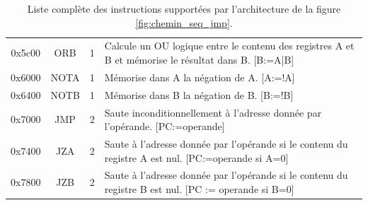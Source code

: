 \begin{table}[htbp]
\begin{tabular}{cccp{10cm}}
0x5c00&	ORB  &1 & Calcule un OU logique entre le contenu des registres A et B et mémorise le résultat dans B. [B:=A|B]\\
0x6000&	NOTA &1 & Mémorise dans A la négation de A. [A:=!A]\\
0x6400&	NOTB &1 &Mémorise dans B la négation de B. [B:=!B]\\
0x7000&	JMP  &2 &Saute inconditionnellement à l'adresse donnée par l'opérande. [PC:=operande]\\
0x7400&	JZA  &2 &Saute à l'adresse donnée par l'opérande si le contenu du registre A est nul. [PC:=operande si A=0]\\
0x7800&	JZB  &2 &Saute à l'adresse donnée par l'opérande si le contenu du registre B est nul. [PC := operande si B=0]
\end{tabular}
\caption{\label{table:list_instruction} Liste complète des instructions supportées par l'architecture de la figure \ref{fig:chemin_seq_jmp}.}
\end{table}









